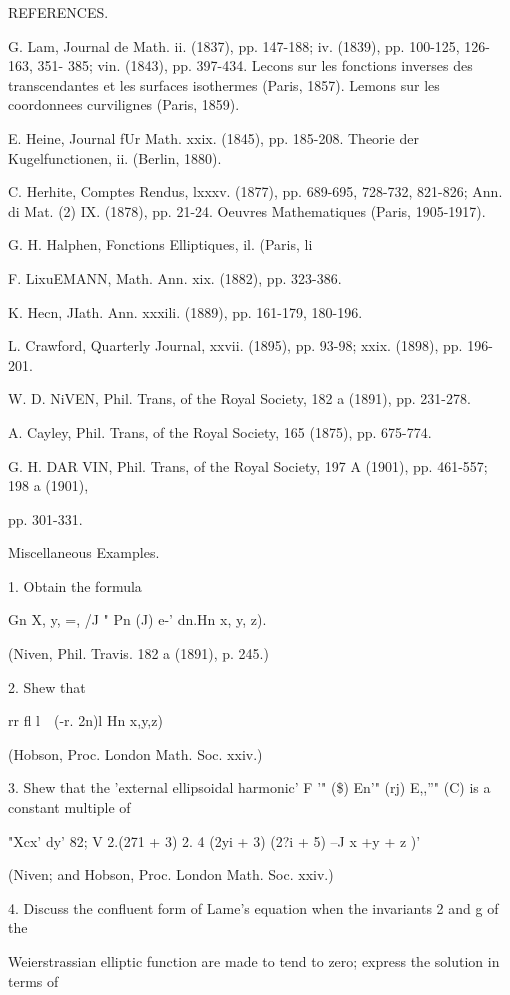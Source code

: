{{{{{{{{REFERENCES.

G. Lam, Journal de Math. ii. (1837), pp. 147-188; iv. (1839), pp.
100-125, 126-163, 351- 385; vin. (1843), pp. 397-434. Lecons sur les
fonctions inverses des transcendantes et les surfaces isothermes
(Paris, 1857). Lemons sur les coordonnees curvilignes (Paris, 1859).

E. Heine, Journal fUr Math. xxix. (1845), pp. 185-208. Theorie der
Kugelfunctionen, ii. (Berlin, 1880).

C. Herhite, Comptes Rendus, lxxxv. (1877), pp. 689-695, 728-732,
821-826; Ann. di Mat. (2) IX. (1878), pp. 21-24. Oeuvres
Mathematiques (Paris, 1905-1917).

%
%

G. H. Halphen, Fonctions Elliptiques, il. (Paris, li

F. LixuEMANN, Math. Ann. xix. (1882), pp. 323-386.

K. Hecn, JIath. Ann. xxxili. (1889), pp. 161-179, 180-196.

L. Crawford, Quarterly Journal, xxvii. (1895), pp. 93-98; xxix.
(1898), pp. 196-201.

W. D. NiVEN, Phil. Trans, of the Royal Society, 182 a (1891), pp.
231-278.

A. Cayley, Phil. Trans, of the Royal Society, 165 (1875), pp. 675-774.

G. H. DAR VIN, Phil. Trans, of the Royal Society, 197 A (1901), pp.
461-557; 198 a (1901),

pp. 301-331.

Miscellaneous Examples.

1. Obtain the formula

Gn X, y, =, /J " Pn (J) e-' dn.Hn x, y, z).

(Niven, Phil. Travis. 182 a (1891), p. 245.)

2. Shew that

rr fl l\ \ (-r. 2n)l Hn x,y,z)

(Hobson, Proc. London Math. Soc. xxiv.)

3. Shew that the 'external ellipsoidal harmonic' F '" (\$) En'" (rj)
E,,''" (C) is a constant multiple of

"Xcx' dy' 82; V 2.(271 + 3) 2. 4 (2yi + 3) (2?i + 5) --J x +y + z )'

(Niven; and Hobson, Proc. London Math. Soc. xxiv.)

4. Discuss the confluent form of Lame's equation when the invariants 2
and g of the

Weierstrassian elliptic function are made to tend to zero; express the
solution in terms of

}}}}}}}}
